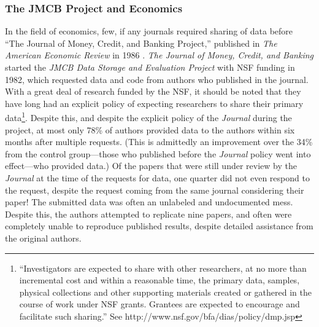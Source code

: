 \documentclass[12pt] {article}
\begin{document}
\subsubsection{The JMCB Project and
Economics}\label{the-jmcb-project-and-economics}

In the field of economics, few, if any journals required sharing of data
before ``The Journal of Money, Credit, and Banking Project,'' published
in \emph{The American Economic Review} in 1986 \citep{dewald_replication_1986}. \emph{The Journal of Money, Credit, and Banking} started
the \emph{JMCB Data Storage and Evaluation Project} with NSF funding in
1982, which requested data and code from authors who published in the
journal. With a great deal of research funded by the NSF, it should be
noted that they have long had an explicit policy of expecting
researchers to share their primary data\footnote{``Investigators are
  expected to share with other researchers, at no more than incremental
  cost and within a reasonable time, the primary data, samples, physical
  collections and other supporting materials created or gathered in the
  course of work under NSF grants. Grantees are expected to encourage
  and facilitate such sharing.'' See
  http://www.nsf.gov/bfa/dias/policy/dmp.jsp}. Despite this, and despite
the explicit policy of the \emph{Journal} during the project, at most
only 78\% of authors provided data to the authors within six months
after multiple requests. (This is admittedly an improvement over the
34\% from the control group---those who published before the
\emph{Journal} policy went into effect---who provided data.) Of the
papers that were still under review by the \emph{Journal} at the time of
the requests for data, one quarter did not even respond to the request,
despite the request coming from the same journal considering their
paper! The submitted data was often an unlabeled and undocumented mess.
Despite this, the authors attempted to replicate nine papers, and often
were completely unable to reproduce published results, despite detailed
assistance from the original authors.
\end{document}
